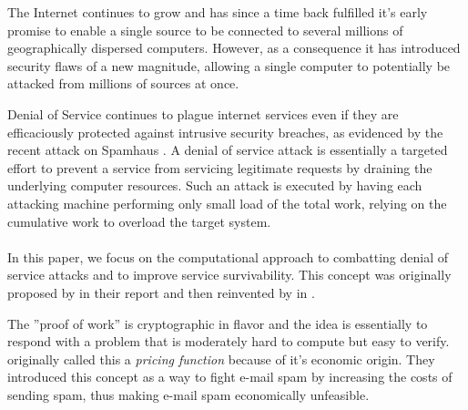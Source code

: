 The Internet continues to grow and has since a time back fulfilled it's early promise to enable a single source to be connected to several millions of geographically dispersed computers. However, as a consequence it has introduced security flaws of a new magnitude, allowing a single computer to potentially be attacked from millions of sources at once.

Denial of Service continues to plague internet services even if they are efficaciously protected against intrusive security breaches, as evidenced by the recent attack on Spamhaus \cite{BBC}. A denial of service attack is essentially a targeted effort to prevent a service from servicing legitimate requests by draining the underlying computer resources. Such an attack is executed by having each attacking machine performing only small load of the total work, relying on the cumulative work to overload the target system. 
\\
\\
In this paper, we focus on the computational approach to combatting denial of service attacks and to improve service survivability. This concept was originally proposed by \citeauthor{DworkN92} in their report  and then reinvented by \citeauthor{Back02} in . 

The ''proof of work'' is cryptographic in flavor and the idea is essentially to respond with a problem that is moderately hard to compute but easy to verify. \citeauthor{DworkN92} originally called this a \emph{pricing function} because of it's economic origin. They introduced this concept as a way to fight e-mail spam by increasing the costs of sending spam, thus making e-mail spam economically unfeasible.




